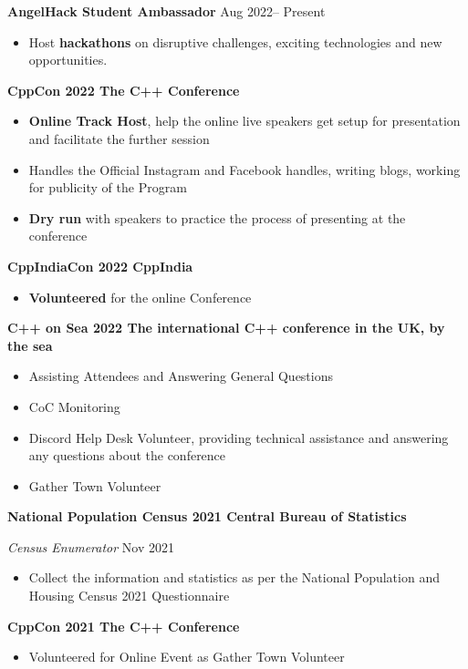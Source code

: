 {\textbf{AngelHack Student Ambassador} \hfill Aug 2022-- Present}\par
\begin{itemize}
	\item Host \textbf{hackathons} on disruptive challenges, exciting technologies and new opportunities.
\end{itemize}\par

\textbf{CppCon 2022 \hfill The C++ Conference}\par
\begin{itemize}
	\item \textbf{Online Track Host}, help the online live speakers get setup for presentation and facilitate the further session
    \item Handles the Official Instagram and Facebook handles, writing blogs, working for publicity of the Program
	\item \textbf{Dry run} with speakers to practice the process of presenting at the conference
\end{itemize}\par

\textbf{CppIndiaCon 2022 \hfill CppIndia}\par
\begin{itemize}
	\item \textbf{Volunteered} for the online Conference
\end{itemize}\par

\textbf{C++ on Sea 2022 \hfill The international C++ conference in the UK, by the sea}\par
\begin{itemize}
	\item Assisting Attendees and Answering General Questions
	\item CoC Monitoring
	\item Discord Help Desk Volunteer, providing technical assistance and answering any questions about the conference
	\item Gather Town Volunteer
\end{itemize}\par

\textbf{National Population Census 2021 \hfill Central Bureau of Statistics} \par
\textit{Census Enumerator}  \hfill Nov 2021
\begin{itemize}
	\item Collect the information and statistics as per the National Population and Housing Census 2021 Questionnaire
\end{itemize}\par

\textbf{CppCon 2021 \hfill The C++ Conference}\par
\begin{itemize}
	\item Volunteered for Online Event as Gather Town Volunteer
\end{itemize}\par